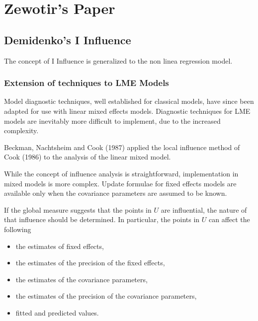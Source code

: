 \documentclass[12pt, a4paper]{article}
\begin{document}
\chapter{Zewotir's Paper}
	




\section{Demidenko's I Influence} %
The concept of I Influence is generalized  to the non linea regression model.


\subsection{Extension of techniques to LME Models} %

Model diagnostic techniques, well established for classical models, have since been adapted for use with linear mixed effects models. Diagnostic techniques for LME models are inevitably more difficult to implement, due to the increased complexity.

Beckman, Nachtsheim and Cook (1987) \citet{Beckman} applied the local influence method of Cook (1986) to the analysis of the linear mixed model.

While the concept of influence analysis is straightforward, implementation in mixed models is more complex. Update formulae for fixed effects models are available only when the covariance parameters are assumed to be known.

If the global measure suggests that the points in $U$ are influential, the nature of that influence should be determined. In particular, the points in $U$ can affect the following

\begin{itemize}
	\item the estimates of fixed effects,
	\item the estimates of the precision of the fixed effects,
	\item the estimates of the covariance parameters,
	\item the estimates of the precision of the covariance parameters,
	\item fitted and predicted values.
\end{itemize}
\end{document}
